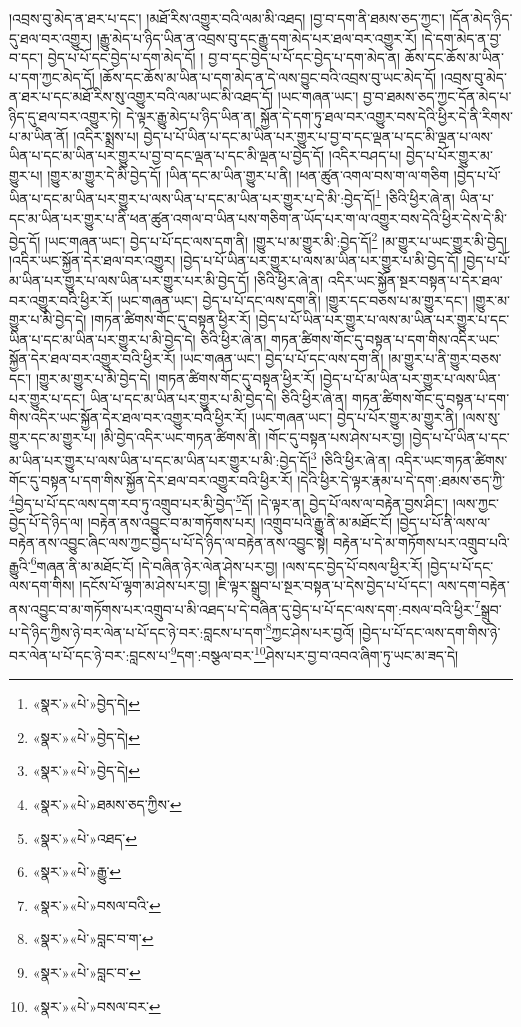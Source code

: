 །འབྲས་བུ་མེད་ན་ཐར་པ་དང་། །མཐོ་རིས་འགྱུར་བའི་ལམ་མི་འཐད། །བྱ་བ་དག་ནི་ཐམས་ཅད་ཀྱང་། །དོན་མེད་ཉིད་དུ་ཐལ་བར་འགྱུར། །རྒྱུ་མེད་པ་ཉིད་ཡིན་ན་འབྲས་བུ་དང་རྒྱུ་དག་མེད་པར་ཐལ་བར་འགྱུར་རོ། །དེ་དག་མེད་ན་བྱ་བ་དང་། བྱེད་པ་པོ་དང་བྱེད་པ་དག་མེད་དོ། །
བྱ་བ་དང་བྱེད་པ་པོ་དང་བྱེད་པ་དག་མེད་ན། ཆོས་དང་ཆོས་མ་ཡིན་པ་དག་ཀྱང་མེད་དོ། །ཆོས་དང་ཆོས་མ་ཡིན་པ་དག་མེད་ན་དེ་ལས་བྱུང་བའི་འབྲས་བུ་ཡང་མེད་དོ། །འབྲས་བུ་མེད་ན་ཐར་པ་དང་མཐོ་རིས་སུ་འགྱུར་བའི་ལམ་ཡང་མི་འཐད་དོ། །ཡང་གཞན་ཡང་། བྱ་བ་ཐམས་ཅད་ཀྱང་དོན་མེད་པ་ཉིད་དུ་ཐལ་བར་འགྱུར་ཏེ། དེ་ལྟར་རྒྱུ་མེད་པ་ཉིད་ཡིན་ན། སྐྱོན་དེ་དག་ཏུ་ཐལ་བར་འགྱུར་བས་དེའི་ཕྱིར་དེ་ནི་རིགས་པ་མ་ཡིན་ནོ། །འདིར་སྨྲས་པ། བྱེད་པ་པོ་ཡིན་པ་དང་མ་ཡིན་པར་གྱུར་པ་བྱ་བ་དང་ལྡན་པ་དང་མི་ལྡན་པ་ལས་ཡིན་པ་དང་མ་ཡིན་པར་གྱུར་པ་བྱ་བ་དང་ལྡན་པ་དང་མི་ལྡན་པ་བྱེད་དོ། །འདིར་བཤད་པ། བྱེད་པ་པོར་གྱུར་མ་གྱུར་པ། །གྱུར་མ་གྱུར་དེ་མི་བྱེད་དོ། །ཡིན་དང་མ་ཡིན་གྱུར་པ་ནི། །ཕན་ཚུན་འགལ་བས་ག་ལ་གཅིག །བྱེད་པ་པོ་ཡིན་པ་དང་མ་ཡིན་པར་གྱུར་པ་ལས་ཡིན་པ་དང་མ་ཡིན་པར་གྱུར་པ་དེ་མི་:བྱེད་དོ།\footnote{«སྣར་»«པེ་»བྱེད་དེ།} །ཅིའི་ཕྱིར་ཞེ་ན། ཡིན་པ་དང་མ་ཡིན་པར་གྱུར་པ་ནི་ཕན་ཚུན་འགལ་བ་ཡིན་པས་གཅིག་ན་ཡོད་པར་ག་ལ་འགྱུར་བས་དེའི་ཕྱིར་དེས་དེ་མི་བྱེད་དོ། །ཡང་གཞན་ཡང་། བྱེད་པ་པོ་དང་ལས་དག་ནི། །གྱུར་པ་མ་གྱུར་མི་:བྱེད་དོ།\footnote{«སྣར་»«པེ་»བྱེད་དེ།} །མ་གྱུར་པ་ཡང་གྱུར་མི་བྱེད། །འདིར་ཡང་སྐྱོན་དེར་ཐལ་བར་འགྱུར། །བྱེད་པ་པོ་ཡིན་པར་གྱུར་པ་ལས་མ་ཡིན་པར་གྱུར་པ་མི་བྱེད་དོ། །བྱེད་པ་པོ་མ་ཡིན་པར་གྱུར་པ་ལས་ཡིན་པར་གྱུར་པར་མི་བྱེད་དོ། །ཅིའི་ཕྱིར་ཞེ་ན། འདིར་ཡང་སྐྱོན་སྔར་བསྟན་པ་དེར་ཐལ་བར་འགྱུར་བའི་ཕྱིར་རོ། །ཡང་གཞན་ཡང་། བྱེད་པ་པོ་དང་ལས་དག་ནི། །གྱུར་དང་བཅས་པ་མ་གྱུར་དང་། །གྱུར་མ་གྱུར་པ་མི་བྱེད་དེ། །གཏན་ཚིགས་གོང་དུ་བསྟན་ཕྱིར་རོ། །བྱེད་པ་པོ་ཡིན་པར་གྱུར་པ་ལས་མ་ཡིན་པར་གྱུར་པ་དང་ཡིན་པ་དང་མ་ཡིན་པར་གྱུར་པ་མི་བྱེད་དེ། ཅིའི་ཕྱིར་ཞེ་ན། གཏན་ཚིགས་གོང་དུ་བསྟན་པ་དག་གིས་འདིར་ཡང་སྐྱོན་དེར་ཐལ་བར་འགྱུར་བའི་ཕྱིར་རོ། །ཡང་གཞན་ཡང་། བྱེད་པ་པོ་དང་ལས་དག་ནི། །མ་གྱུར་པ་ནི་གྱུར་བཅས་དང་། །གྱུར་མ་གྱུར་པ་མི་བྱེད་དེ། །གཏན་ཚིགས་གོང་དུ་བསྟན་ཕྱིར་རོ། །བྱེད་པ་པོ་མ་ཡིན་པར་གྱུར་པ་ལས་ཡིན་པར་གྱུར་པ་དང་། ཡིན་པ་དང་མ་ཡིན་པར་གྱུར་པ་མི་བྱེད་དེ། ཅིའི་ཕྱིར་ཞེ་ན། གཏན་ཚིགས་གོང་དུ་བསྟན་པ་དག་གིས་འདིར་ཡང་སྐྱོན་དེར་ཐལ་བར་འགྱུར་བའི་ཕྱིར་རོ། །ཡང་གཞན་ཡང་། བྱེད་པ་པོར་གྱུར་མ་གྱུར་ནི། །ལས་སུ་གྱུར་དང་མ་གྱུར་པ། །མི་བྱེད་འདིར་ཡང་གཏན་ཚིགས་ནི། །གོང་དུ་བསྟན་པས་ཤེས་པར་བྱ། །བྱེད་པ་པོ་ཡིན་པ་དང་མ་ཡིན་པར་གྱུར་པ་ལས་ཡིན་པ་དང་མ་ཡིན་པར་གྱུར་པ་མི་:བྱེད་དོ།\footnote{«སྣར་»«པེ་»བྱེད་དེ།} །ཅིའི་ཕྱིར་ཞེ་ན། འདིར་ཡང་གཏན་ཚིགས་གོང་དུ་བསྟན་པ་དག་གིས་སྐྱོན་དེར་ཐལ་བར་འགྱུར་བའི་ཕྱིར་རོ། །དེའི་ཕྱིར་དེ་ལྟར་རྣམ་པ་དེ་དག་:ཐམས་ཅད་ཀྱི་\footnote{«སྣར་»«པེ་»ཐམས་ཅད་ཀྱིས་}བྱེད་པ་པོ་དང་ལས་དག་རབ་ཏུ་འགྲུབ་པར་མི་བྱེད་\footnote{«སྣར་»«པེ་»འཐད་}དོ། །དེ་ལྟར་ན། བྱེད་པོ་ལས་ལ་བརྟེན་བྱས་ཤིང་། །ལས་ཀྱང་བྱེད་པོ་དེ་ཉིད་ལ། །བརྟེན་ནས་འབྱུང་བ་མ་གཏོགས་པར། །འགྲུབ་པའི་རྒྱུ་ནི་མ་མཐོང་ངོ། །བྱེད་པ་པོ་ནི་ལས་ལ་བརྟེན་ནས་འབྱུང་ཞིང་ལས་ཀྱང་བྱེད་པ་པོ་དེ་ཉིད་ལ་བརྟེན་ནས་འབྱུང་སྟེ། བརྟེན་པ་དེ་མ་གཏོགས་པར་འགྲུབ་པའི་རྒྱུའི་\footnote{«སྣར་»«པེ་»རྒྱུ་}གཞན་ནི་མ་མཐོང་ངོ། །དེ་བཞིན་ཉེར་ལེན་ཤེས་པར་བྱ། །ལས་དང་བྱེད་པོ་བསལ་ཕྱིར་རོ། །བྱེད་པ་པོ་དང་ལས་དག་གིས། །དངོས་པོ་ལྷག་མ་ཤེས་པར་བྱ། །ཇི་ལྟར་སྒྲུབ་པ་སྔར་བསྟན་པ་དེས་བྱེད་པ་པོ་དང་། ལས་དག་བརྟེན་ནས་འབྱུང་བ་མ་གཏོགས་པར་འགྲུབ་པ་མི་འཐད་པ་དེ་བཞིན་དུ་བྱེད་པ་པོ་དང་ལས་དག་:བསལ་བའི་ཕྱིར་\footnote{«སྣར་»«པེ་»བསལ་བའི་}སྒྲུབ་པ་དེ་ཉིད་ཀྱིས་ཉེ་བར་ལེན་པ་པོ་དང་ཉེ་བར་:བླངས་པ་དག་\footnote{«སྣར་»«པེ་»བླང་བ་ག་}ཀྱང་ཤེས་པར་བྱའོ། །བྱེད་པ་པོ་དང་ལས་དག་གིས་ཉེ་བར་ལེན་པ་པོ་དང་ཉེ་བར་:བླངས་པ་\footnote{«སྣར་»«པེ་»བླང་བ་}དག་:བསྩལ་བར་\footnote{«སྣར་»«པེ་»བསལ་བར་}ཤེས་པར་བྱ་བ་འབའ་ཞིག་ཏུ་ཡང་མ་ཟད་དེ། 